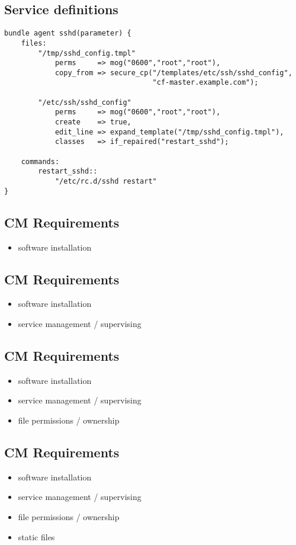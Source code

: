\documentclass[xga]{xdvislides}
\begin{document}
\subsection{Service definitions}
\smallish
\begin{verbatim}
bundle agent sshd(parameter) {
    files:
        "/tmp/sshd_config.tmpl"
            perms     => mog("0600","root","root"),
            copy_from => secure_cp("/templates/etc/ssh/sshd_config",
                                   "cf-master.example.com");

        "/etc/ssh/sshd_config"
            perms     => mog("0600","root","root"),
            create    => true,
            edit_line => expand_template("/tmp/sshd_config.tmpl"),
            classes   => if_repaired("restart_sshd");

    commands:
        restart_sshd::
            "/etc/rc.d/sshd restart"
}
\end{verbatim}
\Normalsize

\subsection{CM Requirements}
\begin{itemize}
	\item software installation
\end{itemize}

\subsection{CM Requirements}
\begin{itemize}
	\item software installation
	\item service management / supervising
\end{itemize}

\subsection{CM Requirements}
\begin{itemize}
	\item software installation
	\item service management / supervising
	\item file permissions / ownership
\end{itemize}

\subsection{CM Requirements}
\begin{itemize}
	\item software installation
	\item service management / supervising
	\item file permissions / ownership
	\item static files
\end{itemize}
\end{document}

